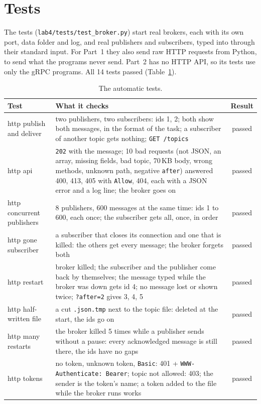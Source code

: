 \documentclass[11pt,a4paper]{article}
\newcommand{\code}[1]{{\frenchspacing\texttt{#1}}}
\begin{document}
\section{Tests}\label{sec:tests}

The tests (\code{lab4/tests/test\_broker.py}) start real brokers, each with its own port, data folder
and log, and real publishers and subscribers, typed into through their standard input. For Part~1
they also send raw HTTP requests from Python, to send what the programs never send. Part~2 has no
HTTP API, so its tests use only the gRPC programs. All 14 tests passed (Table~\ref{tab:tests}).

\begin{table}[tbp]
\centering\small
\caption{The automatic tests.}\label{tab:tests}
\begin{tabularx}{\linewidth}{@{}lXc@{}}
\toprule
Test & What it checks & Result \\
\midrule
http publish and deliver & two publishers, two subscribers: ids 1, 2; both show both messages, in the format of the task; a subscriber of another topic gets nothing; \code{GET /topics} & passed \\
http api & \code{202} with the message; 10 bad requests (not JSON, an array, missing fields, bad topic, 70\,KB body, wrong methods, unknown path, negative \code{after}) answered 400, 413, 405 with \code{Allow}, 404, each with a JSON error and a log line; the broker goes on & passed \\
http concurrent publishers & 8 publishers, 600 messages at the same time: ids 1 to 600, each once; the subscriber gets all, once, in order & passed \\
http gone subscriber & a subscriber that closes its connection and one that is killed: the others get every message; the broker forgets both & passed \\
http restart & broker killed; the subscriber and the publisher come back by themselves; the message typed while the broker was down gets id 4; no message lost or shown twice; \code{?after=2} gives 3, 4, 5 & passed \\
http half-written file & a cut \code{.json.tmp} next to the topic file: deleted at the start, the ids go on & passed \\
http many restarts & the broker killed 5 times while a publisher sends without a pause: every acknowledged message is still there, the ids have no gaps & passed \\
http tokens & no token, unknown token, \code{Basic}: 401 + \code{WWW-Authenticate: Bearer}; topic not allowed: 403; the sender is the token's name; a token added to the file while the broker runs works & passed \\

\end{tabularx}
\end{table}
\end{document}
